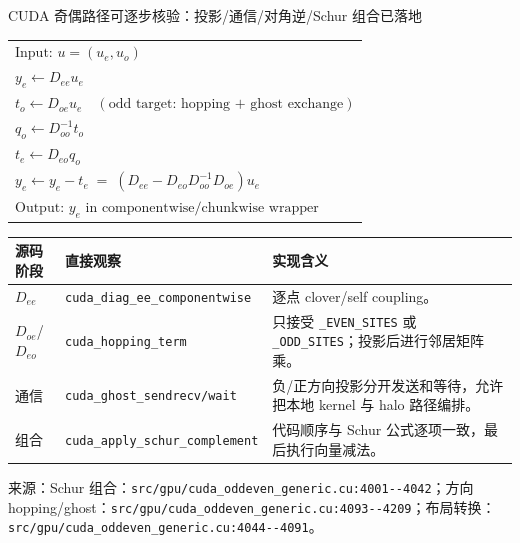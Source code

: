 \documentclass[UTF8,aspectratio=169,11pt]{ctexbeamer}
\newcommand{\source}[1]{%
  \vspace{0.06em}\par{\raggedright\scriptsize\color{muted}来源：#1\par}}
\newcommand{\code}[1]{\nolinkurl{#1}}
\newcommand{\denseframe}{%
  \footnotesize
  \setlength{\tabcolsep}{2.5pt}%
  \renewcommand{\arraystretch}{0.76}%
}
\begin{document}
\begin{frame}[t]{CUDA 奇偶路径可逐步核验：投影/通信/对角逆/Schur 组合已落地}
  \denseframe
  \begin{center}
  \small
  \begin{tabular}{@{}l@{}}
    $\text{Input: }u=(u_e,u_o)$ \\
    $y_e\gets D_{ee}u_e$ \\
    $t_o\gets D_{oe}u_e\quad(\text{odd target: hopping + ghost exchange})$ \\
    $q_o\gets D_{oo}^{-1}t_o$ \\
    $t_e\gets D_{eo}q_o$ \\
    $y_e\gets y_e-t_e\;=\;(D_{ee}-D_{eo}D_{oo}^{-1}D_{oe})u_e$ \\
    $\text{Output: }y_e\text{ in componentwise/chunkwise wrapper}$
  \end{tabular}
  \end{center}
  \vspace{0.08cm}
  \begin{tabularx}{0.96\textwidth}{@{}p{}p{}Y@{}}
    \toprule
    源码阶段 & 直接观察 & 实现含义 \\
    \midrule
    $D_{ee}$ & \code{cuda_diag_ee_componentwise} & 逐点 clover/self coupling。 \\
    $D_{oe}$/$D_{eo}$ & \code{cuda_hopping_term} & 只接受 \code{_EVEN_SITES} 或 \code{_ODD_SITES}；投影后进行邻居矩阵乘。 \\
    通信 & \code{cuda_ghost_sendrecv/wait} & 负/正方向投影分开发送和等待，允许把本地 kernel 与 halo 路径编排。 \\
    组合 & \code{cuda_apply_schur_complement} & 代码顺序与 Schur 公式逐项一致，最后执行向量减法。 \\
    \bottomrule
  \end{tabularx}
  \source{Schur 组合：\code{src/gpu/cuda_oddeven_generic.cu:4001--4042}；方向 hopping/ghost：\code{src/gpu/cuda_oddeven_generic.cu:4093--4209}；布局转换：\code{src/gpu/cuda_oddeven_generic.cu:4044--4091}。}
\end{frame}
\end{document}
